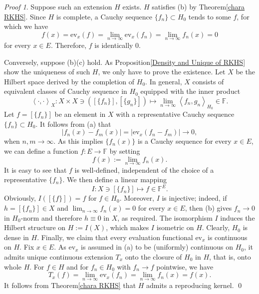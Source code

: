 \documentclass[a4paper,12pt]{article}
\theoremstyle{remark}
\newtheorem*{prf}{Proof}
\theoremstyle{definition}
\theoremstyle{definition}
\theoremstyle{definition}
\newcommand{\ip}[2]{\left<#1, #2 \right>}
\newcommand{\abs}[1]{\left| #1 \right|}
\newcommand{\ev}[1]{\mathrm{ev}_{#1}}
\begin{document}
\begin{prf}
	Suppose such an extension \( H \) exists. \( H \) satisfies (b) by Theorem\ref{chara RKHS}.
	Since \( H \) is complete, a Cauchy sequence \( \{f_n\} \subset H_0\) tends to some \( f \), for which we have
	\begin{equation*}
		f(x) = \ev{x}(f) = \lim_{n \to \infty} \ev{x}(f_n) = \lim_{n \to \infty} f_n(x) = 0
	\end{equation*}
	for every \( x \in E \). Therefore, \( f \) is identically 0.

	Conversely, suppose (b)(c) hold. As Proposition\ref{Density and Unique of RKHS} show the uniqueness of such \( H \), we only have to prove the existence.
	Let \( X \) be the Hilbert space derived by the completion of \( H_0 \).
	In general, \( X \) consists of equivalent classes of Cauchy sequence in \( H_0 \) equipped with the inner product
	\begin{equation*}
		\ip{\cdot }{\cdot }_X : X \times X \ni \left( [\{f_n\}], [\{g_n\}] \right) \mapsto \lim_{n \to \infty} \ip{f_n}{g_n}_{H_0} \in \mathbb{F}.
	\end{equation*}
	Let \( f = [\{f_n\}] \) be an element in \( X \) with a representative Cauchy sequence \( \{f_n\} \subset H_0 \). It follows from (a) that
	\begin{equation*}
		\abs{f_n(x)-f_m(x)} = \abs{\ev{x}(f_n-f_m)} \to 0,
	\end{equation*}
	when \( n,m \to \infty \).
	As this implies \( \{f_n(x)\} \) is a Cauchy sequence for every \( x \in E \), we can define a function \( f: E \to \mathbb{F} \) by setting
	\begin{equation*}
		f(x) := \lim_{n \to \infty} f_n(x).
	\end{equation*}
	It is easy to see that \( f \) is well-defined, independent of the choice of a representative \( \{f_n\} \). We then define a linear mapping
	\begin{equation*}
		I:X \ni [\{f_n\}] \mapsto f \in \mathbb{F}^E.
	\end{equation*}
	Obviously, \( I([\{f\}]) = f \) for \( f \in  H_0 \). Moreover,
	\( I \) is injective; indeed, if \( h = [\{f_n\}] \in X\) and \( \lim_{n \to \infty} f_n(x)=0 \) for every \( x \in E \), then (b) gives \( f_n \to 0 \) in \( H_0 \)-norm and therefore \( h \equiv 0 \) in \( X \), as required. The isomorphism \( I \) induces the Hilbert structure on \( H:= I(X)\), which makes \( I \) isometric on \( H \). Clearly, \( H_0 \) is dense in \( H \). Finally, we claim that every evaluation functional \( \ev{x} \) is continuous on \( H \). Fix \( x \in E \). As \( \ev{x} \) is assumed in (a) to be (uniformly) continuous on \( H_0 \), it admits unique continuous extension \( T_x \) onto the closure of \( H_0 \) in \( H \), that is, onto whole \( H \). For \( f \in H \) and for \( f_n \in H_0\) with \( f_n \to f \) pointwise, we have
	\begin{equation*}
		T_x(f) = \lim_{n \to \infty} \ev{x}(f_n) = \lim_{n \to \infty}f_n(x) = f(x).
	\end{equation*}
	It follows from Theorem\ref{chara RKHS} that \( H \) admits a reproducing kernel.
	\qed\end{prf}
\end{document}
